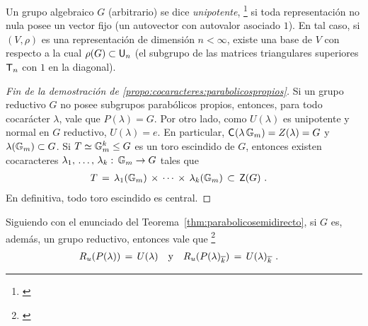 Un grupo algebraico $G$ (arbitrario) se dice \emph{unipotente},%
\footnote{
	\cite[\S~6.45]{MilneAlgebraicGroups}
}
si toda representaci\'{o}n no nula posee un vector fijo (un autovector con
autovalor asociado $1$). En tal caso, si $(V,\rho)$ es una representaci\'{o}n
de dimensi\'{o}n $n<\infty$, existe una base de $V$ con respecto a la cual
$\rho(G)\subset\unipotentes[n]$ (el subgrupo de las matrices triangulares
superiores $\triangulares[n]$ con $1$ en la diagonal).

\begin{proof}[Fin de la demostraci\'{o}n de %
	\ref{propo:cocaracteres:parabolicospropios}]
	Si un grupo reductivo $G$ no posee subgrupos parab\'{o}licos propios,
	entonces, para todo cocar\'{a}cter $\lambda$, vale que $P(\lambda)=G$.
	Por otro lado, como $U(\lambda)$ es unipotente y normal en $G$
	reductivo, $U(\lambda)=e$. En particular,
	$\centraliza(\lambda\,\multiplicativo)=Z(\lambda)=G$ y
	$\lambda(\multiplicativo)\subset G$. Si
	$T\simeq\multiplicativo^k\leq G$ es un toro escindido de $G$, entonces
	existen cocaracteres
	$\lista{\lambda}{k}:\,\multiplicativo\rightarrow G$ tales que
	\begin{align*}
		T & \,=\,\lambda_1(\multiplicativo)\,\times\,\cdots\,\times\,
			\lambda_k(\multiplicativo) \,\subset\,\centre(G)
		\text{ .}
	\end{align*}
	En definitiva, todo toro escindido es central.
\end{proof}

\begin{obsParabolicoSemidirecto}\label{obs:parabolicosemidirecto}
	Siguiendo con el enunciado del Teorema~\ref{thm:parabolicosemidirecto},
	si $G$ es, adem\'{a}s, un grupo reductivo, entonces vale que%
	\footnote{
		\cite[Proposition~17.60]{MilneAlgebraicGroups}
	}
	\begin{align*}
		R_u(P(\lambda)) \,=\,U(\lambda) & \quad\text{y}\quad
		R_u(P(\lambda)_{\algclos k}) \,=\,U(\lambda)_{\algclos k}
		\text{ .}
	\end{align*}
\end{obsParabolicoSemidirecto}
